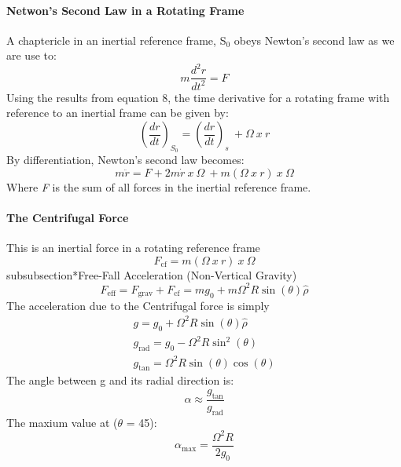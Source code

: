 \paragraph{Netwon's Second Law in a Rotating Frame}
A chaptericle in an inertial reference frame, S$_0$ obeys Newton's second law as we are use to:
\begin{equation}
m\frac{d^2r}{dt^2} = F
\end{equation}
Using the results from equation 8, the time derivative for a rotating frame with reference to an inertial frame can be given by:
\begin{equation}
(\frac{dr}{dt})_{S_0} = (\frac{dr}{dt})_s \ + \Omega \ x \ r
\end{equation}
By differentiation, Newton's second law becomes:
\begin{equation}
m\ddot{r} = F + 2m\dot{r} \ x \ \Omega \ + m(\Omega \ x \ r) \ x \ \Omega
\end{equation}
Where \textit{F} is the sum of all forces in the inertial reference frame. 
\paragraph{The Centrifugal Force}
This is an inertial force in a rotating reference frame 
\begin{equation}
F_{\text{cf}} = m(\Omega \ x \ r) \ x \ \Omega
\end{equation}
subsubsection*{Free-Fall Acceleration (Non-Vertical Gravity)}
\begin{equation}
F_{\text{eff}} = F_{\text{grav}} + F_{\text{cf}} = mg_0 + m\Omega^2R\sin(\theta)\hat{\rho}
\end{equation}
The acceleration due to the Centrifugal force is simply 
\begin{equation}
\begin{split}
g = g_0 + \Omega^2R\sin(\theta)\hat{\rho} \\
g_{\text{rad}} = g_0 - \Omega^2R\sin^2(\theta)  \\
g_{\text{tan}} = \Omega^2R\sin(\theta)\cos(\theta)
\end{split}
\end{equation}
The angle between g and its radial direction is:
\begin{equation}
\alpha \approx \frac{g_{\text{tan}}}{g_{\text{rad}}} 
\end{equation}
The maxium value at ($\theta$ = 45):
\begin{equation}
\alpha_{\text{max}} =  \frac{\Omega^2R}{2g_0}
\end{equation}
